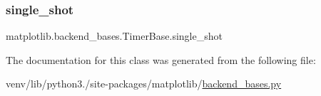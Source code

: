 \subsubsection{\texorpdfstring{single\+\_\+shot}{single\_shot}}
{\footnotesize\ttfamily matplotlib.\+backend\+\_\+bases.\+Timer\+Base.\+single\+\_\+shot}



The documentation for this class was generated from the following file\+:\begin{DoxyCompactItemize}
\item 
venv/lib/python3./site-\/packages/matplotlib/\hyperlink{backend__bases_8py}{backend\+\_\+bases.\+py}\end{DoxyCompactItemize}
